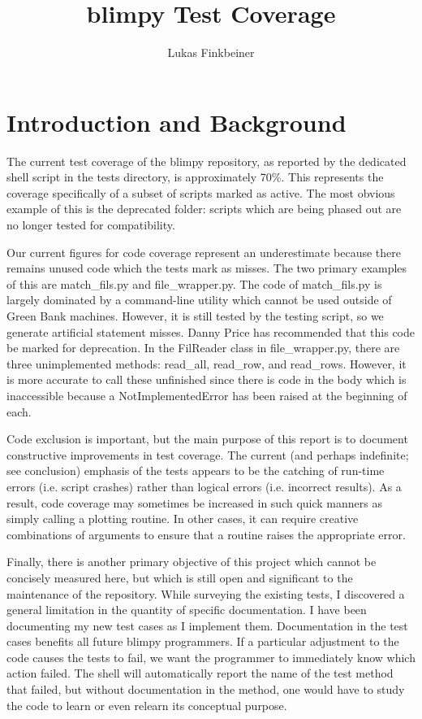 \documentclass[12pt]{article}
\title{blimpy Test Coverage}
\author{Lukas Finkbeiner}
\begin{document}
\maketitle

\section{Introduction and Background}

\quad \quad The current test coverage of the blimpy repository, as reported by the dedicated shell script in the tests directory, is approximately 70\%. This represents the coverage specifically of a subset of scripts marked as active. The most obvious example of this is the deprecated folder: scripts which are being phased out are no longer tested for compatibility. 

Our current figures for code coverage represent an underestimate because there remains unused code which the tests mark as misses. The two primary examples of this are match\_fils.py and file\_wrapper.py. The code of match\_fils.py is largely dominated by a command-line utility which cannot be used outside of Green Bank machines. However, it is still tested by the testing script, so we generate artificial statement misses. Danny Price has recommended that this code be marked for deprecation. In the FilReader class in file\_wrapper.py, there are three unimplemented methods: read\_all, read\_row, and read\_rows. However, it is more accurate to call these unfinished since there is code in the body which is inaccessible because a NotImplementedError has been raised at the beginning of each.

Code exclusion is important, but the main purpose of this report is to document constructive improvements in test coverage. The current (and perhaps indefinite; see conclusion) emphasis of the tests appears to be the catching of run-time errors (i.e. script crashes) rather than logical errors (i.e. incorrect results). As a result, code coverage may sometimes be increased in such quick manners as simply calling a plotting routine. In other cases, it can require creative combinations of arguments to ensure that a routine raises the appropriate error.

Finally, there is another primary objective of this project which cannot be concisely measured here, but which is still open and significant to the maintenance of the repository. While surveying the existing tests, I discovered a general limitation in the quantity of specific documentation. I have been documenting my new test cases as I implement them. Documentation in the test cases benefits all future blimpy programmers. If a particular adjustment to the code causes the tests to fail, we want the programmer to immediately know which action failed. The shell will automatically report the name of the test method that failed, but without documentation in the method, one would have to study the code to learn or even relearn its conceptual purpose.
\end{document}
